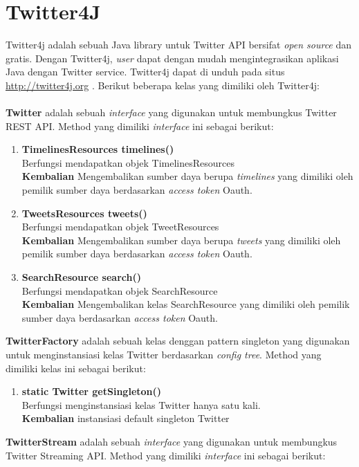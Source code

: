 \section{Twitter4J}
Twitter4j adalah sebuah Java library untuk Twitter API bersifat \textit{open source} dan gratis. Dengan Twitter4j, \textit{user} dapat dengan mudah mengintegrasikan aplikasi Java dengan Twitter service. Twitter4j dapat di unduh pada situs \url{http://twitter4j.org} \cite{Twitter4j:2015}. Berikut beberapa kelas yang dimiliki oleh Twitter4j:\\\\
\textbf{Twitter} adalah sebuah \textit{interface} yang digunakan untuk membungkus Twitter REST API. Method yang dimiliki \textit{interface} ini sebagai berikut:
\begin{enumerate}
	\item \textbf{TimelinesResources timelines()}\\
	Berfungsi mendapatkan objek TimelinesResources\\
	\textbf{Kembalian} Mengembalikan sumber daya berupa \textit{timelines} yang dimiliki oleh pemilik sumber daya berdasarkan \textit{access token} Oauth.
	\item \textbf{TweetsResources tweets()}\\
	Berfungsi mendapatkan objek TweetResources\\
	\textbf{Kembalian} Mengembalikan sumber daya berupa \textit{tweets} yang dimiliki oleh pemilik sumber daya berdasarkan \textit{access token} Oauth.
	\item \textbf{SearchResource search()}\\
	Berfungsi mendapatkan objek SearchResource\\
	\textbf{Kembalian} Mengembalikan kelas SearchResource yang dimiliki oleh pemilik sumber daya berdasarkan \textit{access token} Oauth.
\end{enumerate}
\textbf{TwitterFactory} adalah sebuah kelas denggan pattern singleton yang digunakan untuk menginstansiasi kelas Twitter berdasarkan \textit{config tree}. Method yang dimiliki kelas ini sebagai berikut:
\begin{enumerate} 
	\item \textbf{static Twitter getSingleton()}\\
	Berfungsi menginstansiasi kelas Twitter hanya satu kali.\\
	\textbf{Kembalian} instansiasi default singleton Twitter 
\end{enumerate}
\textbf{TwitterStream} adalah sebuah \textit{interface} yang digunakan untuk membungkus Twitter Streaming API. Method yang dimiliki \textit{interface} ini sebagai berikut:
